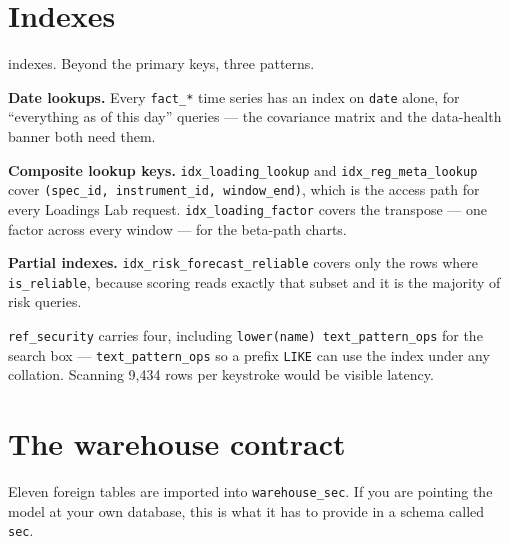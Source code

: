 \documentclass[11pt,a4paper]{article}
\newcommand{\code}[1]{\texttt{\small #1}}
\begin{document}
\section{Indexes}

\schemaIndexCount{} indexes. Beyond the primary keys, three patterns.

\textbf{Date lookups.} Every \code{fact\_*} time series has an index on
\code{date} alone, for ``everything as of this day'' queries --- the covariance
matrix and the data-health banner both need them.

\textbf{Composite lookup keys.} \code{idx\_loading\_lookup} and
\code{idx\_reg\_meta\_lookup} cover \code{(spec\_id, instrument\_id, window\_end)},
which is the access path for every Loadings Lab request.
\code{idx\_loading\_factor} covers the transpose --- one factor across every window
--- for the beta-path charts.

\textbf{Partial indexes.} \code{idx\_risk\_forecast\_reliable} covers only the rows
where \code{is\_reliable}, because scoring reads exactly that subset and it is the
majority of risk queries.

\code{ref\_security} carries four, including
\code{lower(name) text\_pattern\_ops} for the search box ---
\code{text\_pattern\_ops} so a prefix \code{LIKE} can use the index under any
collation. Scanning 9{,}434 rows per keystroke would be visible latency.

\section{The warehouse contract}
\label{sec:contract}

Eleven foreign tables are imported into \code{warehouse\_sec}. If you are pointing
the model at your own database, this is what it has to provide in a schema called
\code{sec}.
\end{document}
